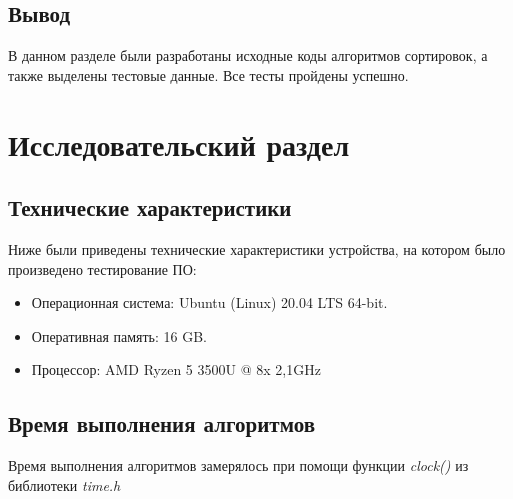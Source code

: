 \section{Вывод}

В данном разделе были разработаны исходные коды алгоритмов сортировок, а также выделены тестовые данные. Все тесты пройдены успешно.

\chapter{Исследовательский раздел}

\section{Технические характеристики}

Ниже были приведены технические характеристики устройства, на котором было произведено тестирование ПО:

\begin{itemize}
	\item Операционная система: Ubuntu (Linux) 20.04 LTS 64-bit.
	\item Оперативная память: 16 GB.
	\item Процессор: AMD Ryzen 5 3500U @ 8x 2,1GHz
\end{itemize}

\section{Время выполнения алгоритмов}

Время выполнения алгоритмов замерялось при помощи функции \textit{clock()} из библиотеки \textit{time.h}

